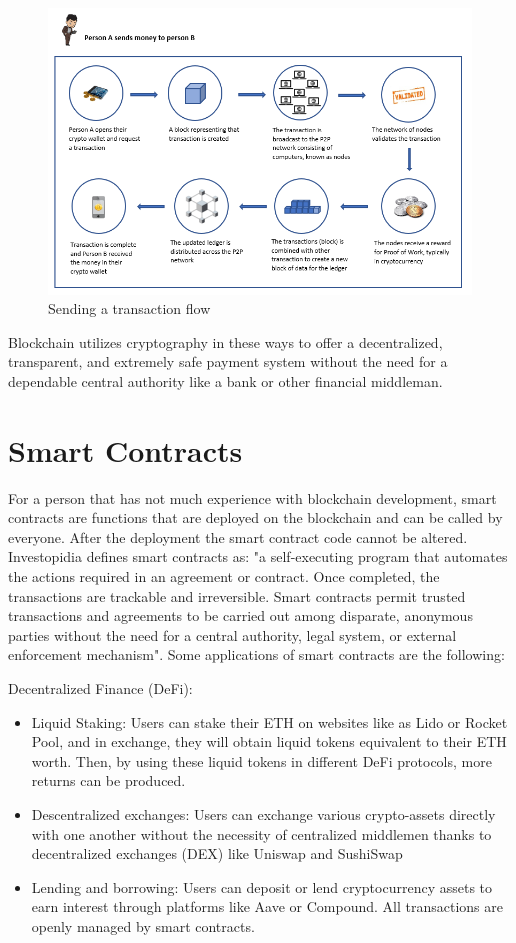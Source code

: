 \begin{figure}[htbp]
	\centering
	\includegraphics[scale=1]{./figures/crypto-flow.png}
	\caption{Sending a transaction flow}
\end{figure}
\par Blockchain utilizes cryptography in these ways to offer a decentralized, transparent, and extremely safe payment system without the need for a dependable central authority like a bank or other financial middleman.

\section{Smart Contracts}
\label{sec:ch2sec3}
For a person that has not much experience with blockchain development, smart contracts are functions that are deployed on the blockchain and can be called by everyone. After the deployment the smart contract code cannot be altered. Investopidia defines smart contracts as: "a self-executing program that automates the actions required in an agreement or contract. Once completed, the transactions are trackable and irreversible. Smart contracts permit trusted transactions and agreements to be carried out among disparate, anonymous parties without the need for a central authority, legal system, or external enforcement mechanism"\cite{smartcontracts}. Some applications of smart contracts are the following:

Decentralized Finance (DeFi):
\begin{itemize}
	\item Liquid Staking: Users can stake their ETH on websites like as Lido or Rocket Pool, and in exchange, they will obtain liquid tokens equivalent to their ETH worth. Then, by using these liquid tokens in different DeFi protocols, more returns can be produced.
	\item Descentralized exchanges: Users can exchange various crypto-assets directly with one another without the necessity of centralized middlemen thanks to decentralized exchanges (DEX) like Uniswap and SushiSwap
	\item Lending and borrowing: Users can deposit or lend cryptocurrency assets to earn interest through platforms like Aave or Compound. All transactions are openly managed by smart contracts.
\end{itemize}

